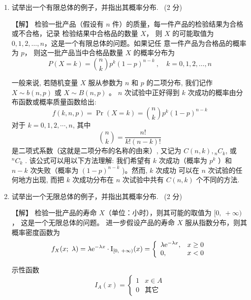 \documentclass[openany]{book}
\begin{document}
\begin{enumerate}
  \item 试举出一个有限总体的例子，并指出其概率分布.~{\color{cyan} (2 分)}

  {\color{red} \heiti 【解】} {\color{teal} \kaishu
    检验一批产品（假设有 $n$ 件）的质量，每一件产品的检验结果为合格或不合格，记录
    检验结果中合格品的数量 $X$，
    则 $X$ 的可能取值为 $0, 1, 2, \ldots, n$，这是一个有限总体的问题。如果记任
    意一件产品为合格品的概率为 $p$，
    则这一批产品当中合格品数量 $X$ 的概率分布为
    $$ P \left( X = k \right) = \binom{n}{k}
    p^k \left( 1 - p \right)^{n-k}~, \quad
    k = 0, 1, 2, \ldots, n $$}

\begin{remark}
  一般来说, 若随机变量 \(X\) 服从参数为 \(n\) 和 \(p\) 的二项分布, 我们记作
  \(X \sim b(n, p)\) 或 \(X \sim B(n, p)\) 。 \(n\) 次试验中正好得到
  \(k\) 次成功的概率由分布函数或概率质量函数给出:
  \[
  f(k, n, p)=\operatorname{Pr}(X=k)=\binom{n}{k} p^k(1-p)^{n-k}
  \]
  对于 \(k=0,1,2, \cdots, n\),
  其中
  \[
  \binom{n}{k}=\frac{n !}{k !(n-k)  !}
  \]
  是二项式系数（这就是二项分布的名称的由来）, 又记为 \(C(n, k),{ }_n C_k\),
  或 \({ }^n C_k\) . 该公式可以用以下方法理解: 我们希望有 \(k\)
  次成功（概率为
  \(p^k\) ）和 \(n-k\) 次失败（概率为 \((1-p)^{n-k}\) )。然而, \(k\) 次成功
  可以在 \(n\) 次试验的任何地方出现, 而把 \(k\) 次成功分布在 \(n\)
  次试验中共有 \(C(n, k)\) 个不同的方法.
\end{remark}

  \item 试举出一个无限总体的例子，并指出其概率分布.~{\color{cyan} (2 分)}

  {\color{red} \heiti 【解】} {\color{teal} \kaishu
    检验一批产品的寿命 $X$（单位：小时），则其可能的取值为 $[ 0,~ +\infty )$，
    这是一个无限总体的问题。
    进一步假设产品的寿命 $X$ 服从指数分布，则其概率密度函数为
    $$ f_X (x;~ \lambda) = \lambda {\rm e}^{-\lambda x} \cdot {\rm
      I}_{[ 0,~ +\infty )} (x) = \left\{
    \begin{array}{ll}  \lambda {\rm e}^{-\lambda x}, & x\geq 0 \\ 0,
      & x < 0 \end{array} \right. $$ }

    \begin{remark}
      示性函数
      \begin{equation}
       I_A(x) = \begin{cases}
         1& x\in A \\
         0& \text{其它}
       \end{cases}
      \end{equation}
    \end{remark}


\end{enumerate}
\end{document}
